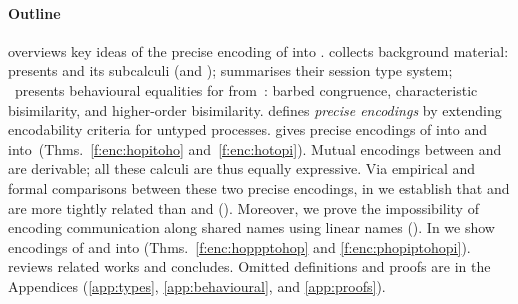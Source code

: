 \documentclass[preprint,11pt]{elsarticle}
\begin{document}
{\paragraph{Outline} 
 overviews key ideas of the precise encoding of \HOp into \sessp.
{} 
collects background material:
presents \HOp and its 
subcalculi (\HO and \sessp); %
 summarises their session type system;
~pres\-ents  behavioural equalities for \HOp from~\cite{characteristic_bis,KouzapasPY17}:
barbed congruence, characteristic bisimilarity, 
and higher-order bisimilarity.
 defines \emph{precise %
encodings} by extending encodability criteria  for untyped processes. %
{} %
gives {precise encodings} of \HOp into \HO and  into~\sessp (Thms.~\ref{f:enc:hopitoho} and~\ref{f:enc:hotopi}).
Mutual encodings between \sessp and \HO are derivable; 
all these calculi are thus equally expressive.
Via
empirical and formal comparisons between these two precise encodings, in  we establish that
\HOp and \HO are more tightly related than \HOp and \sessp ().
Moreover, we prove the impossibility of encoding communication along shared names
using linear names ().
In  %
we show 
encodings of \HOpp and \PHOp 
into \HOp
(Thms.~\ref{f:enc:hoppptohop} and \ref{f:enc:phopiptohopi}).
{} reviews related works and 
 concludes.
{Omitted definitions and  proofs are in the Appendices (\ref{app:types}, \ref{app:behavioural}, and \ref{app:proofs}).
} 

}
\end{document}
